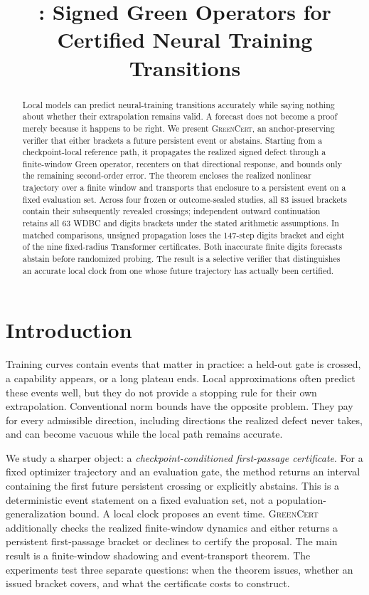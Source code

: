 \documentclass{article}
\title{\method: Signed Green Operators for Certified Neural Training Transitions}
\author{\paperauthor}
\newcommand{\method}{\textsc{GreenCert}}
\begin{document}
\maketitle

\begin{abstract}
Local models can predict neural-training transitions accurately while saying
nothing about whether their extrapolation remains valid.  A forecast does not
become a proof merely because it happens to be right.  We present \method, an
anchor-preserving verifier that either brackets a future persistent event or
abstains.  Starting from a checkpoint-local reference path, it propagates the
realized signed defect through a finite-window Green operator, recenters on
that directional response, and bounds only the remaining second-order error.
The theorem encloses the realized nonlinear trajectory over a finite window
and transports that enclosure to a persistent event on a fixed evaluation set.
Across four frozen or outcome-sealed studies, all 83 issued brackets contain their subsequently revealed crossings;
independent outward continuation retains all 63 WDBC and digits brackets
under the stated arithmetic assumptions.  In matched
comparisons, unsigned propagation loses the 147-step digits bracket and eight
of the nine fixed-radius Transformer certificates.  Both inaccurate finite digits
forecasts abstain before randomized probing.  The result is a selective
verifier that distinguishes an accurate local clock from one whose future
trajectory has actually been certified.
\end{abstract}

\section{Introduction}

Training curves contain events that matter in practice: a held-out gate is
crossed, a capability appears, or a long plateau ends.  Local approximations
often predict these events well, but they do not provide a stopping rule for
their own extrapolation.  Conventional norm bounds have the opposite problem.
They pay for every admissible direction, including directions the realized
defect never takes, and can become vacuous while the local path remains
accurate.

We study a sharper object: a \emph{checkpoint-conditioned first-passage
certificate}.  For a fixed optimizer trajectory and an evaluation gate, the
method returns an interval containing the first future persistent crossing or
explicitly abstains.  This is a deterministic event statement on a fixed
evaluation set, not a population-generalization bound.
A local clock proposes an event time.  \method{} additionally checks the
realized finite-window dynamics and either returns a persistent first-passage
bracket or declines to certify the proposal.
The main result is a finite-window shadowing and event-transport theorem.  The
experiments test three separate questions: when the theorem issues, whether an
issued bracket covers, and what the certificate costs to construct.
\end{document}
